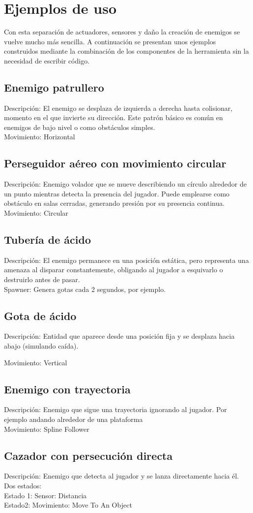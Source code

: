 \section{Ejemplos de uso}
Con esta separación de actuadores, sensores y daño la creación de enemigos se vuelve mucho más sencilla. A continuación se presentan unos ejemplos construidos mediante la combinación de los componentes de la herramienta sin la necesidad de escribir código.

\subsection{Enemigo patrullero}
Descripción:  El enemigo se desplaza de izquierda a derecha hasta colisionar, momento en el que invierte su dirección. Este patrón básico es común en enemigos de bajo nivel o como obstáculos simples. \\
Movimiento: Horizontal

\subsection{ Perseguidor aéreo con movimiento circular}
Descripción: Enemigo volador que se mueve describiendo un círculo alrededor de un punto mientras detecta la presencia del jugador. Puede emplearse como obstáculo en salas cerradas, generando presión por su presencia continua.\\
Movimiento: Circular

\subsection{Tubería de ácido}
Descripción: El enemigo permanece en una posición estática, pero representa una amenaza al disparar constantemente, obligando al jugador a esquivarlo o destruirlo antes de pasar.\\
Spawner: Genera gotas cada 2 segundos, por ejemplo.

\subsection{ Gota de ácido}
Descripción: Entidad que aparece desde una posición fija y se desplaza hacia abajo (simulando caída).

Movimiento: Vertical

\subsection{Enemigo con trayectoria}
Descripción: Enemigo que sigue una trayectoria ignorando al jugador. Por ejemplo andando alrededor de una plataforma\\
Movimiento: Spline Follower

\subsection{Cazador con persecución directa}
Descripción: Enemigo que detecta al jugador y se lanza directamente hacia él.
Dos estados:\\
Estado 1: 
Sensor: Distancia\\
Estado2:
Movimiento: Move To An Object 

